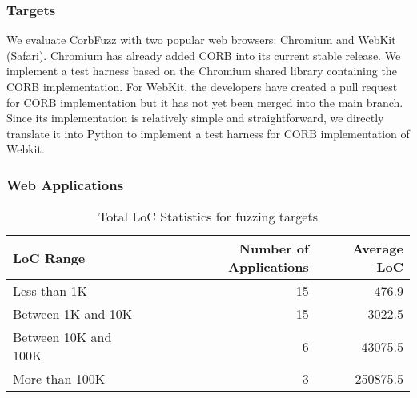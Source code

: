 \documentclass[10pt,conference]{IEEEtran}
\begin{document}
\subsubsection{Targets} We evaluate CorbFuzz with two popular web browsers: Chromium and WebKit (Safari). Chromium has already added CORB into its current stable release. We implement a test harness based on the Chromium shared library containing the CORB implementation. For WebKit, the developers have created a pull request for CORB implementation but it has not yet been merged into the main branch. Since its implementation is relatively simple and straightforward, we directly translate it into Python to implement a test harness for CORB implementation of Webkit. %

\subsubsection{Web Applications} 

\begin{table}[]
\begin{tabular}{|l|r|r|}
\hline
{\bf LoC Range} & {\bf Number of Applications} & {\bf Average LoC} \\ \hline
Less than 1K 
& 15                & 476.9       \\ \hline
Between 1K and 10K 
               & 15                & 3022.5      \\ \hline
Between 10K and 100K            & 6                 & 43075.5     \\ \hline
More than 100K   & 3                 & 250875.5    \\ \hline
\end{tabular}
\centering
\caption{Total LoC Statistics for fuzzing targets}
\label{table: loc}
\end{table}
\end{document}
